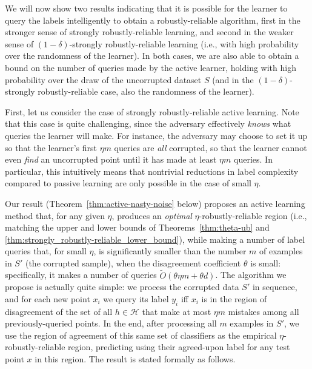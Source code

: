 \documentclass[11pt]{article}
\newcommand{\0}{\mathbf{0}}
\newcommand{\1}{\mathbf{1}}
\newcommand{\cH}{\mathcal{H}}
\begin{document}
We will now show two results indicating that
it is possible for the learner to query the labels intelligently to obtain a robustly-reliable algorithm, first in the stronger sense of strongly robustly-reliable learning,
and second in the weaker sense of $(1-\delta)$-strongly robustly-reliable learning (i.e., with high probability over the randomness of the learner).
In both cases, we are also able to obtain a bound on the number of queries made by the active learner, holding with high probability over the draw of the uncorrupted dataset $S$ (and in the $(1-\delta)$-strongly robustly-reliable case, also the randomness of the learner).


First,
let us consider the case of strongly robustly-reliable
active learning.
Note that this case is quite challenging,
since the adversary effectively \emph{knows} what queries
the learner will make. For instance, the adversary may
choose to set it up so that the learner's first $\eta m$
queries are \emph{all} corrupted, so that the learner
cannot even \emph{find} an uncorrupted point until it has
made at least $\eta m$ queries.
In particular, this intuitively means that nontrivial reductions in label complexity
compared to passive learning are only possible in the case of small $\eta$.


Our result (Theorem~\ref{thm:active-nasty-noise} below)
proposes an active learning method that,
for any given $\eta$,
produces an \emph{optimal} $\eta$-robustly-reliable region
(i.e., matching the upper and lower bounds of
Theorems~\ref{thm:theta-ub} and \ref{thm:strongly_robustly-reliable_lower_bound}),
while making a number of label queries that, for small $\eta$,
is significantly smaller than the number $m$ of examples in $S'$
(the corrupted sample),
when the disagreement coefficient $\theta$ is small: specifically,
it makes a number of queries $\tilde{O}( \theta \eta m + \theta d )$.
The algorithm we propose is actually quite simple:
we process the corrupted
data $S'$ in sequence, and for each new point $x_i$ we query its label $y_i$
iff $x_i$ is in the region of disagreement of the set of all $h \in \cH$
that make at most $\eta m$ mistakes among all previously-queried points.
In the end, after processing all $m$ examples in $S'$,
we use the region of agreement of this same set of classifiers
as the empirical $\eta$-robustly-reliable region, predicting using their
agreed-upon label for any test point $x$ in this region.  The result is stated formally as follows.
\end{document}
